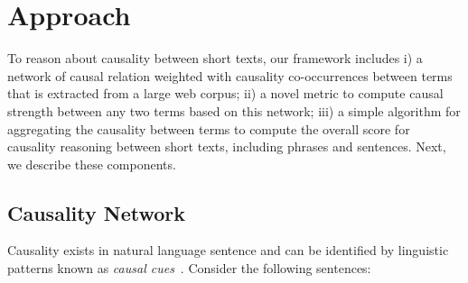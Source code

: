 \section{Approach}
\label{sec:approach}

To reason about causality between short texts,
our framework includes i) a network of causal relation weighted with
causality co-occurrences between terms that is extracted from
a large web corpus; ii) a novel metric to compute causal strength
 between any two terms based on this network; iii)
a simple algorithm for aggregating the causality between terms to
compute the overall score for causality reasoning between short texts,
including phrases and sentences.
Next, we describe these components.

\subsection{Causality Network}
\label{sec:network}

Causality exists in natural language sentence and can be identified by
linguistic patterns known as {\em causal cues}~\cite{ChangC04}.
Consider the following sentences:

